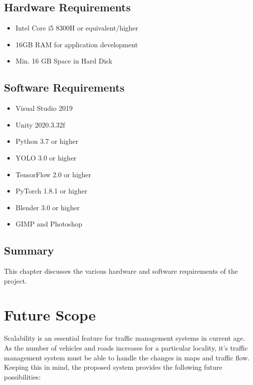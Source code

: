 \documentclass[openany,12pt]{report}
\begin{document}
	\newpage
	\section{Hardware Requirements}
	\begin{itemize}
		\item{Intel Core i5 8300H or equivalent/higher}
		\item{16GB RAM for application development}
		\item{Min. 16 GB Space in Hard Disk}
	\end{itemize}
	
	\section{Software Requirements}
	\begin{itemize}
		\item{Visual Studio 2019}
		\item{Unity 2020.3.32f}
		\item{Python 3.7 or higher}
		\item{YOLO 3.0 or higher}
		\item{TensorFlow 2.0 or higher}
		\item{PyTorch 1.8.1 or higher}
		\item{Blender 3.0 or higher}
		\item{GIMP and Photoshop}
	\end{itemize}
	
	\section{Summary}
	\hspace*{0.5in}This chapter discusses the various hardware and software requirements of the project.
	\chapter {Future Scope}
	

	\hspace{0.5in}Scalability is an essential feature for traffic management systems in current age. As the number of vehicles and roads increases for a particular locality, it's traffic management system must be able to handle the changes in maps and traffic flow. Keeping this in mind, the proposed system provides the following future possibilities:\\
	
\end{document}
